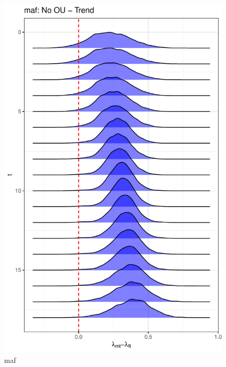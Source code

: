 \documentclass[
  12pt,
]{article}
\begin{document}
\begin{figure}

{\centering \includegraphics[width=0.9\linewidth]{../Figures/maf/lambda_diff} 

}

\caption{maf}\label{fig:unnamed-chunk-13}
\end{figure}
\end{document}
